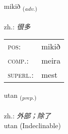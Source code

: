 \documentclass[frontgrid, backgrid]{flacards}\usepackage[]{graphicx}\usepackage[]{xcolor}
\begin{document}
\renewcommand{\flhead}{\vskip5pt \fboxsep=0pt {\small\bfseries\footnotesize Atviksorð | 副词}}
\renewcommand{\fcfoot}{\vskip5pt \fboxsep=0pt \hspace{2pt}{\small\bfseries\footnotesize 1K}}

\renewcommand{\blhead}{\vskip5pt {\small\bfseries\footnotesize Atviksorð | 副词 }}
\renewcommand{\bcfoot}{\vskip5pt \hspace{2pt}{\small\bfseries\footnotesize 1K}}


{mikið \small{\textsubscript{(\textit{adv.})}} \\[1ex] %
\textphonetic{[mɪːcɪð]} \\
zh.: \emph{很多} \\  [2ex]
\renewcommand*{\arraystretch}{0.8}
\begin{tabular}{ll}
\textsc{pos}: & mikið \\ 
\textsc{comp.}: & meira \\ 
\textsc{superl.}: & mest \\
\end{tabular}
}


\renewcommand{\flhead}{\vskip5pt \fboxsep=0pt {\small\bfseries\footnotesize Forsetning | 介词}}
\renewcommand{\fcfoot}{\vskip5pt \fboxsep=0pt \hspace{2pt}{\small\bfseries\footnotesize 1K}}

\renewcommand{\blhead}{\vskip5pt {\small\bfseries\footnotesize Forsetning | 介词 }}
\renewcommand{\bcfoot}{\vskip5pt \hspace{2pt}{\small\bfseries\footnotesize 1K}}


{utan \small{\textsubscript{(\textit{prep.})}} \\[1ex]
\textphonetic{[ʏːtan]} \\
zh.: \emph{外部；除了} \\  [2ex]
utan (Indeclinable)}

\renewcommand{\flhead}{\vskip5pt \fboxsep=0pt {\small\bfseries\footnotesize Nafnorð | 名词}}
\renewcommand{\fcfoot}{\vskip5pt \fboxsep=0pt \hspace{2pt}{\small\bfseries\footnotesize 1K}}
\end{document}
